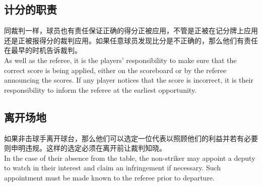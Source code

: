 \subsection{计分的职责}

\noindent 同裁判一样，球员也有责任保证正确的得分正被应用，不管是正被在记分牌上应用还是正被报得分的裁判应用。如果任意球员发现比分是不正确的，那么他们有责任在最早的时机告诉裁判。\\
As well as the referee, it is the players' responsibility to make sure that the correct score is being applied, either on the scoreboard or by the referee announcing the scores. If any player notices that the score is incorrect, it is their responsibility to inform the referee at the earliest opportunity.

\subsection{离开场地}

\noindent 如果非击球手离开球台，那么他们可以选定一位代表以照顾他们的利益并若有必要则申明违规。这样的选定必须在离开前让裁判知晓。\\
In the case of their absence from the table, the non-striker may appoint a deputy to watch in their interest and claim an infringement if necessary. Such appointment must be made known to the referee prior to departure.
